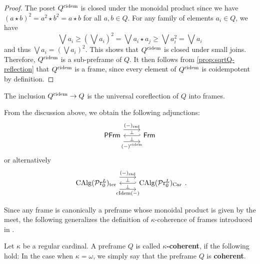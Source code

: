 \documentclass[10pt,a4paper,oneside]{article}
\begin{document}
\begin{proof}
The poset $Q^{\operatorname{cidem}}$ is closed under the monoidal product since we have $(a \star b)^2=a^2 \star b^2=a \star b$ for all $a, b \in Q$. For any family of elements $a_i \in Q$, we have
$$
\bigvee a_i \geq\left(\bigvee a_i\right)^2=\bigvee a_i \star a_j \geq \bigvee a_i^2=\bigvee a_i
$$
and thus $\bigvee a_i=\left(\bigvee a_i\right)^2$. This shows that $Q^{\operatorname{cidem}}$ is closed under small joins. Therefore, $Q^{\operatorname{cidem}}$ is a sub-preframe of $Q$. It then follows from \cref{prop:sqrtQ-reflection} that $Q^{\operatorname{cidem}}$ is a frame, since every element of $Q^{\operatorname{cidem}}$ is coidempotent by definition.
\end{proof}
\begin{prop}
The inclusion $Q^{\operatorname{cidem}} \rightarrow Q$ is the universal coreflection of $Q$ into frames. 
\end{prop}
\begin{cor}\label{prefrmadjoints}
From the discussion above, we obtain the following adjunctions:
$$\begin{tikzcd}
\pfrm \arrow[r, "(-)_{\op{rad}}", shift left=2ex] \arrow[r, "(-)^{\op{cidem}}"', shift right=2ex]  & \arrow[l,"\perp","\perp"', hook'] \frm
\end{tikzcd}$$
or alternatively
$$\begin{tikzcd}
\calg(\prl_0)_{\op{ter}} \arrow[r, "(-)_{\op{rad}}", shift left=2ex] \arrow[r, "\cidem(-)"', shift right=2ex]  & \arrow[l,"\perp","\perp"', hook'] \calg(\prl_0)_{\op{Car}}
\end{tikzcd} .$$
\end{cor}

\begin{rem}
Since any frame is canonically a preframe whose monoidal product is given by the meet, the following generalizes the definition of $\kappa$-coherence of frames introduced in {\cite{krause2023spectrum}}.
\end{rem}

\begin{de}\label{defkcoh}
Let $\kappa$ be a regular cardinal. A preframe $Q$ is called \textbf{$\kappa$-coherent}, if the following hold:
In the case when $\kappa = \omega$, we simply say that the preframe $Q$ is \textbf{coherent}.
\end{de}
\end{document}

